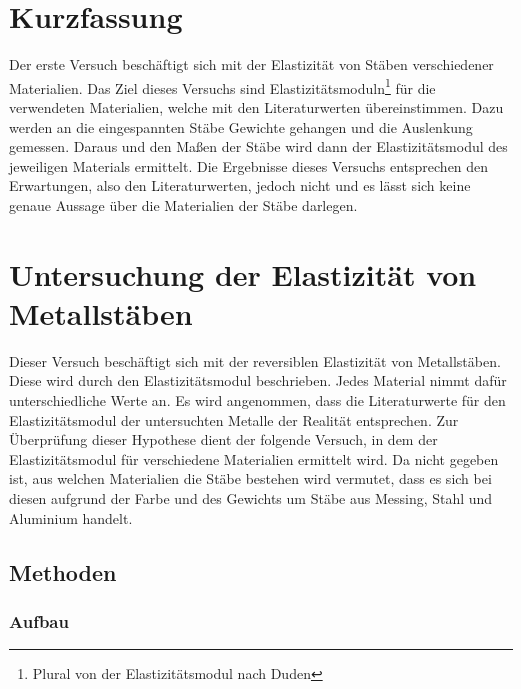 
	\section{Kurzfassung}
		
		Der erste Versuch beschäftigt sich mit der Elastizität von Stäben verschiedener Materialien. Das Ziel dieses Versuchs sind Elastizitätsmoduln\footnote{Plural von \glqq der Elastizitätsmodul\grqq {} nach Duden} für die verwendeten Materialien, welche mit den Literaturwerten übereinstimmen. Dazu werden an die eingespannten Stäbe Gewichte gehangen und die Auslenkung gemessen. Daraus und den Maßen der Stäbe wird dann der Elastizitätsmodul des jeweiligen Materials ermittelt. Die Ergebnisse dieses Versuchs entsprechen den Erwartungen, also den Literaturwerten, jedoch nicht und es lässt sich keine genaue Aussage über die Materialien der Stäbe darlegen.
	
	\section{Untersuchung der Elastizität von Metallstäben}
	
	Dieser Versuch beschäftigt sich mit der reversiblen Elastizität von Metallstäben. Diese wird durch den Elastizitätsmodul beschrieben. Jedes Material nimmt dafür unterschiedliche Werte an. 
	Es wird angenommen, dass die Literaturwerte für den Elastizitätsmodul der untersuchten Metalle der Realität entsprechen. Zur Überprüfung dieser Hypothese dient der folgende Versuch, in dem der Elastizitätsmodul für verschiedene Materialien ermittelt wird.
	Da nicht gegeben ist, aus welchen Materialien die Stäbe bestehen wird vermutet, dass es sich bei diesen aufgrund der Farbe und des Gewichts um Stäbe aus Messing, Stahl und Aluminium handelt.
	
	\subsection{Methoden}	
	
	\subsubsection*{Aufbau}
	
